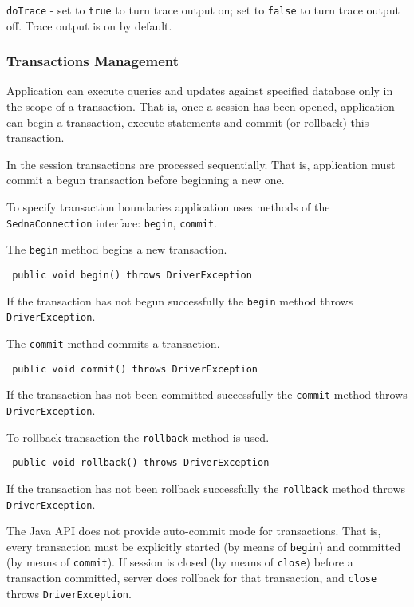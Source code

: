 \documentclass[a4paper,12pt]{article}
\begin{document}
\verb!doTrace! - set to \verb!true! to turn trace output on; set to \verb!false!
to turn trace output off. Trace output is on by default.


\subsubsection{Transactions Management}
Application can execute queries and updates against specified database only in
the scope of a transaction. That is, once a session has been opened, application
can begin a transaction, execute statements and commit (or rollback) this
transaction.

In the session transactions are processed sequentially. That is, application
must commit a begun transaction before beginning a new one.

To specify transaction boundaries application uses methods of the
\verb!SednaConnection! interface: \verb!begin!, \verb!commit!.

The \verb!begin! method begins a new transaction.

\begin{verbatim}
 public void begin() throws DriverException
\end{verbatim}

If the transaction has not begun successfully the \verb!begin! method throws
\verb!DriverException!.

The \verb!commit! method commits a transaction.

\begin{verbatim}
 public void commit() throws DriverException
\end{verbatim}

If the transaction has not been committed successfully the \verb!commit! method
throws \verb!DriverException!.

To rollback transaction the \verb!rollback! method is used.

\begin{verbatim}
 public void rollback() throws DriverException
\end{verbatim}

If the transaction has not been rollback successfully the \verb!rollback! method
throws \verb!DriverException!.

The Java API does not provide auto-commit mode for transactions. That is, every
transaction must be explicitly started (by means of \verb!begin!) and committed
(by means of \verb!commit!). If session is closed (by means of \verb!close!)
before a transaction committed, server does rollback for that transaction, and
\verb!close! throws \verb!DriverException!.
\end{document}
